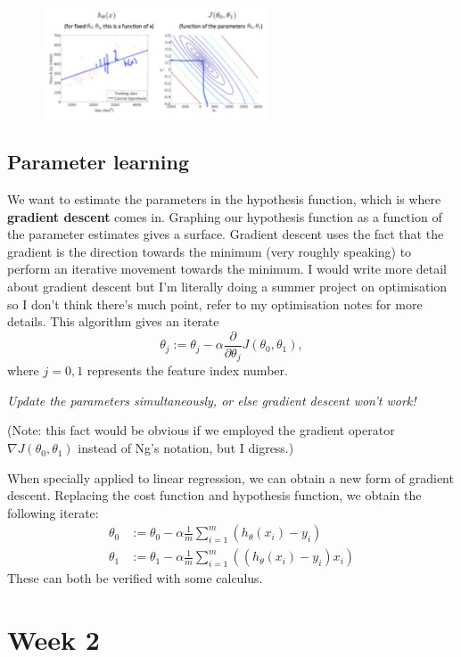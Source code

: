 \documentclass[a4paper, 10pt, oneside]{book}
\begin{document}
\begin{figure}[H]
\centering
\includegraphics[width=0.6\textwidth]{figures/contour.png}
\end{figure}

\section{Parameter learning}

We want to estimate the parameters in the hypothesis function, which is where \textbf{gradient descent} comes in. Graphing our hypothesis function as a function of the parameter estimates gives a surface. Gradient descent uses the fact that the gradient is the direction towards the minimum (very roughly speaking) to perform an iterative movement towards the minimum. I would write more detail about gradient descent but I'm literally doing a summer project on optimisation so I don't think there's much point, refer to my optimisation notes for more details. This algorithm gives an iterate
\[\theta_j := \theta_j - \alpha \frac{\partial}{\partial \theta_j} J(\theta_0, \theta_1),\]
where $j=0,1$ represents the feature index number.
\begin{center}
    \textit{Update the parameters simultaneously, or else gradient descent won't work!}
\end{center}
(Note: this fact would be obvious if we employed the gradient operator $\nabla J(\theta_0, \theta_1)$ instead of Ng's notation, but I digress.)

When specially applied to linear regression, we can obtain a new form of gradient descent. Replacing the cost function and hypothesis function, we obtain the following iterate:
\begin{align*}
    \theta_0 &:= \theta_0 - \alpha \frac1m \sum_{i=1}^m (h_\theta(x_i) - y_i) \\
    \theta_1 &:= \theta_1 - \alpha \frac1m \sum_{i=1}^m ((h_\theta(x_i) - y_i)x_i)
\end{align*}
These can both be verified with some calculus.

\chapter{Week 2}
\end{document}
